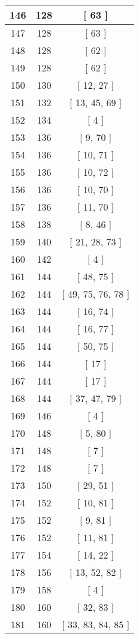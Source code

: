 \begin{center}
\begin{longtable}[H]{|| c c c ||}
\hline
146 & 128 & [ 63 ] \\ 
\hline
147 & 128 & [ 63 ] \\ 
\hline
148 & 128 & [ 62 ] \\ 
\hline
149 & 128 & [ 62 ] \\ 
\hline
150 & 130 & [ 12, 27 ] \\ 
\hline
151 & 132 & [ 13, 45, 69 ] \\ 
\hline
152 & 134 & [ 4 ] \\ 
\hline
153 & 136 & [ 9, 70 ] \\ 
\hline
154 & 136 & [ 10, 71 ] \\ 
\hline
155 & 136 & [ 10, 72 ] \\ 
\hline
156 & 136 & [ 10, 70 ] \\ 
\hline
157 & 136 & [ 11, 70 ] \\ 
\hline
158 & 138 & [ 8, 46 ] \\ 
\hline
159 & 140 & [ 21, 28, 73 ] \\ 
\hline
160 & 142 & [ 4 ] \\ 
\hline
161 & 144 & [ 48, 75 ] \\ 
\hline
162 & 144 & [ 49, 75, 76, 78 ] \\ 
\hline
163 & 144 & [ 16, 74 ] \\ 
\hline
164 & 144 & [ 16, 77 ] \\ 
\hline
165 & 144 & [ 50, 75 ] \\ 
\hline
166 & 144 & [ 17 ] \\ 
\hline
167 & 144 & [ 17 ] \\ 
\hline
168 & 144 & [ 37, 47, 79 ] \\ 
\hline
169 & 146 & [ 4 ] \\ 
\hline
170 & 148 & [ 5, 80 ] \\ 
\hline
171 & 148 & [ 7 ] \\ 
\hline
172 & 148 & [ 7 ] \\ 
\hline
173 & 150 & [ 29, 51 ] \\ 
\hline
174 & 152 & [ 10, 81 ] \\ 
\hline
175 & 152 & [ 9, 81 ] \\ 
\hline
176 & 152 & [ 11, 81 ] \\ 
\hline
177 & 154 & [ 14, 22 ] \\ 
\hline
178 & 156 & [ 13, 52, 82 ] \\ 
\hline
179 & 158 & [ 4 ] \\ 
\hline
180 & 160 & [ 32, 83 ] \\ 
\hline
181 & 160 & [ 33, 83, 84, 85 ] \\ 

\end{longtable}
\end{center}
